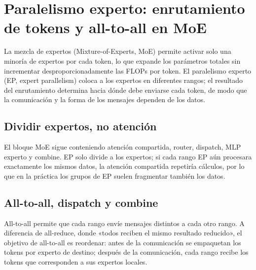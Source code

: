 \section{Paralelismo experto: enrutamiento de tokens y all-to-all en MoE}

La mezcla de expertos (Mixture-of-Experts, MoE) permite activar solo una minoría de expertos por cada token, lo que expande los parámetros totales sin incrementar desproporcionadamente las FLOPs por token. El paralelismo experto (EP, expert parallelism) coloca a los expertos en diferentes rangos; el resultado del enrutamiento determina hacia dónde debe enviarse cada token, de modo que la comunicación y la forma de los mensajes dependen de los datos.

\subsection{Dividir expertos, no atención}

El bloque MoE sigue conteniendo atención compartida, router, dispatch, MLP experto y combine. EP solo divide a los expertos; si cada rango EP aún procesara exactamente los mismos datos, la atención compartida repetiría cálculos, por lo que en la práctica los grupos de EP suelen fragmentar también los datos.




\subsection{All-to-all, dispatch y combine}

All-to-all permite que cada rango envíe mensajes distintos a cada otro rango. A diferencia de all-reduce, donde «todos reciben el mismo resultado reducido», el objetivo de all-to-all es reordenar: antes de la comunicación se empaquetan los tokens por experto de destino; después de la comunicación, cada rango recibe los tokens que corresponden a sus expertos locales.


